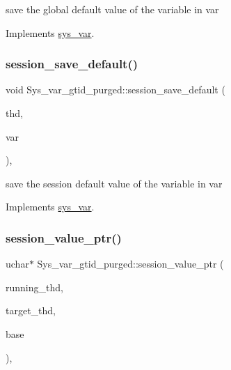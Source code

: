 save the global default value of the variable in var 

Implements \mbox{\hyperlink{classsys__var}{sys\+\_\+var}}.

\mbox{\label{classSys__var__gtid__purged_a899e9b452040b2f08438a6bbaef35644}} 
\subsubsection{\texorpdfstring{session\+\_\+save\+\_\+default()}{session\_save\_default()}}
{\footnotesize\ttfamily void Sys\+\_\+var\+\_\+gtid\+\_\+purged\+::session\+\_\+save\+\_\+default (\begin{DoxyParamCaption}\item[{T\+HD $\ast$}]{thd,  }\item[{\mbox{\hyperlink{classset__var}{set\+\_\+var}} $\ast$}]{var }\end{DoxyParamCaption})\hspace{0.3cm}{\ttfamily [inline]}, {\ttfamily [virtual]}}

save the session default value of the variable in var 

Implements \mbox{\hyperlink{classsys__var}{sys\+\_\+var}}.

\mbox{\label{classSys__var__gtid__purged_adc6d9e58936e3f27ea45e549510be42f}} 
\subsubsection{\texorpdfstring{session\+\_\+value\+\_\+ptr()}{session\_value\_ptr()}}
{\footnotesize\ttfamily uchar$\ast$ Sys\+\_\+var\+\_\+gtid\+\_\+purged\+::session\+\_\+value\+\_\+ptr (\begin{DoxyParamCaption}\item[{T\+HD $\ast$}]{running\+\_\+thd,  }\item[{T\+HD $\ast$}]{target\+\_\+thd,  }\item[{L\+E\+X\+\_\+\+S\+T\+R\+I\+NG $\ast$}]{base }\end{DoxyParamCaption})\hspace{0.3cm}{\ttfamily [inline]}, {\ttfamily [virtual]}}

